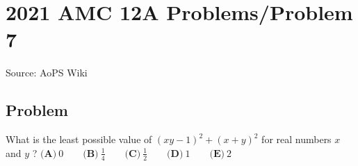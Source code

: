 \documentclass[12pt]{article}
\begin{document}
\section*{{2021 AMC 12A Problems/Problem 7}}
Source: AoPS Wiki

\subsection*{Problem}
What is the least possible value of $(xy-1)^2+(x+y)^2$ for real numbers $x$ and $y$ ? $\textbf{(A)} ~0\qquad\textbf{(B)} ~\frac{1}{4}\qquad\textbf{(C)} ~\frac{1}{2} \qquad\textbf{(D)} ~1 \qquad\textbf{(E)} ~2$
\end{document}
